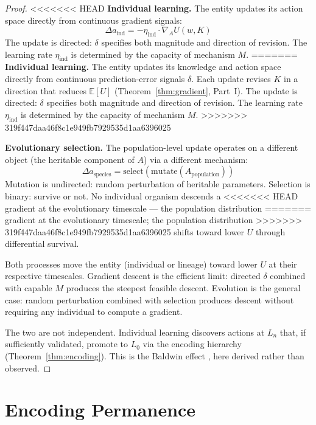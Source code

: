 \documentclass[11pt]{article}
\theoremstyle{definition}
\begin{document}
\begin{proof}
<<<<<<< HEAD
\textbf{Individual learning.} The entity updates its action
space directly from continuous gradient signals:
\[
\Delta a_{\mathrm{ind}} = -\eta_{\mathrm{ind}} \cdot \nabla_A U(w, K)
\]
The update is directed: $\delta$ specifies both magnitude and
direction of revision. The learning rate $\eta_{\mathrm{ind}}$ is
determined by the capacity of mechanism $M$.
=======
\textbf{Individual learning.} The entity updates its knowledge and
action space directly from continuous prediction-error signals
$\delta$. Each update revises $K$ in a direction that reduces
$\mathbb{E}[U]$ (Theorem~\ref{thm:gradient}, Part~I). The update is
directed: $\delta$ specifies both magnitude and direction of revision.
The learning rate $\eta_{\mathrm{ind}}$ is determined by the capacity
of mechanism $M$.
>>>>>>> 319f447daa46f8c1e949fb7929535d1aa6396025

\textbf{Evolutionary selection.} The population-level update operates
on a different object (the heritable component of $A$) via a different
mechanism:
\[
\Delta a_{\mathrm{species}} = \mathrm{select}(\mathrm{mutate}(A_{\mathrm{population}}))
\]
Mutation is undirected: random perturbation of heritable parameters.
Selection is binary: survive or not. No individual organism descends a
<<<<<<< HEAD
gradient at the evolutionary timescale --- the population distribution
=======
gradient at the evolutionary timescale; the population distribution
>>>>>>> 319f447daa46f8c1e949fb7929535d1aa6396025
shifts toward lower $U$ through differential survival.

Both processes move the entity (individual or lineage) toward lower
$U$ at their respective timescales. Gradient descent is the efficient
limit: directed $\delta$ combined with capable $M$ produces the
steepest feasible descent. Evolution is the general case: random
perturbation combined with selection produces descent without requiring
any individual to compute a gradient.

The two are not independent. Individual learning discovers actions at
$L_n$ that, if sufficiently validated, promote to $L_0$ via the
encoding hierarchy (Theorem~\ref{thm:encoding}). This is the Baldwin
effect \cite{Hinton1987}, here derived rather than observed.
\end{proof}

\section{Encoding Permanence}
\label{sec:encoding}
\end{document}
